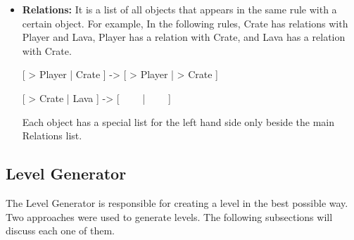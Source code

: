 \begin{itemize}
	\begin{center}
		[ > Player | Crate ] -> [ > Player | > Crate ]
	\end{center}
	\begin{center}
		[ > Crate | Crate ] -> [ > Crate | > Crate ]
	\end{center}
	The Crate object appeared in the both rules. The first rule the Crate object appeared once, while the second rule it appeared twice. This means the minimum number of Crates is two. This is not the case when an object have a Create behavior. Create rules are responsible for generating objects. The Minimum Number of the Create objects is updated to reflect the least number of appearances in the Create rules. For example the following rules have two Create rules (the first and the third).
	\begin{center}
		[ > Player | \ \ \ \ ] -> [ Crate | Player ]
	\end{center}
	\begin{center}
		[ > Crate | Crate ] -> [ > Crate | > Crate ]
	\end{center}
	\begin{center}
		[ Gem | Crate | Gem ] -> [ Crate | Crate | Crate ]
	\end{center}
	The number of Crate objects in each rule are 0, 2, 1 respectively. In normal case, the minimum number of Crate object will be 2. Since Crate object have Create behavior (in both the first and the third rule) then the minimum number of objects will be zero instead.
	\item \textbf{Relations:} It is a list of all objects that appears in the same rule with a certain object. For example, In the following rules, Crate has relations with Player and Lava, Player has a relation with Crate, and Lava has a relation with Crate.
	\begin{center}
		[ > Player | Crate ] -> [ > Player | > Crate ]
	\end{center}
	\begin{center}
		[ > Crate | Lava ] -> [ \ \ \ \ | \ \ \ \ ]
	\end{center}
	Each object has a special list for the left hand side only beside the main Relations list.	
\end{itemize}

\subsection{Level Generator}
The Level Generator is responsible for creating a level in the best possible way. Two approaches were used to generate levels. The following subsections will discuss each one of them.

